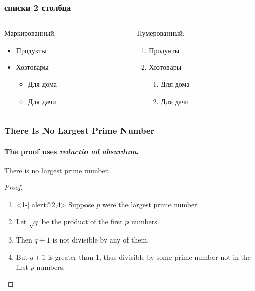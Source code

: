 \documentclass{beamer}
\begin{document}
\begin{frame}
	\frametitle{списки 2 столбца}
\begin{columns}[c]
\begin{column}{5cm}
	Маркированный:	
	\begin{itemize}
		\item Продукты
		\item Хозтовары
		\begin{itemize}
			\item Для дома 
			\item Для \alert{дачи}
			\end{itemize}
			\end{itemize}	
\end{column}

 \begin{column}{5cm}
	Нумерованный:
	\begin{enumerate}
		\item Продукты
		\item Хозтовары
		
		\begin{enumerate}
			\item Для дома 
			\item Для дачи
			\end{enumerate}
			
			
			\end{enumerate}
 \end{column}
\end{columns}
	
	
\end{frame}

\begin{frame}
	\frametitle{There Is No Largest Prime Number}
	\framesubtitle{The proof uses \textit{reductio ad absurdum}.}
	\begin{theorem}
		There is no largest prime number.
	\end{theorem}
	\begin{proof}
		\begin{enumerate}
			\item<1-| alert@{2,4}> Suppose $p$ were the largest prime number.
			\item<2-3> Let $\sqrt{q}$ be the product of the first $p$ numbers.
			\item<3-> Then $q+1$ is not divisible by any of them.
			\item<1-> But $q + 1$ is greater than $1$, thus divisible by some prime
			number not in the first $p$ numbers.\qedhere
		\end{enumerate}
	\end{proof}
\end{frame}
	
	
\end{document}

